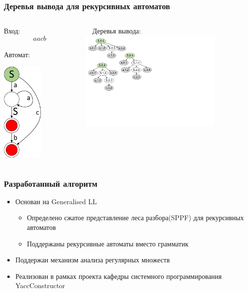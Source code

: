 \documentclass{beamer}
\begin{document}
	\begin{frame} 
		\frametitle{Деревья вывода для рекурсивных автоматов}
		\begin{columns}
			\begin{column}{3.7cm}
				Вход: $$aacb$$ \\
				\vspace{10pt}
				Автомат: \\
				\vspace{5pt}
				\begin{center}
					\includegraphics[width=2cm]{pictures/G0minimizedAutomaton.pdf}
				\end{center}
			\end{column}
		
     		\begin{column}{6cm}
     			\ \ Деревья вывода:\\
     			\vspace{5pt}
     			\includegraphics[width=7cm]{pictures/G0trees.pdf}
			\end{column}
		
		\end{columns}
	\end{frame}
	
	\begin{frame} 
		\frametitle{Разработанный алгоритм}
		\begin{itemize}
            \item Основан на Generalised LL
            \begin{itemize}
                \item Определено сжатое представление леса разбора(SPPF) для 
                рекурсивных автоматов
                \item Поддержаны рекурсивные автоматы вместо грамматик
            \end{itemize}
            \item Поддержан механизм анализа регулярных множеств
            \item Реализован в рамках проекта кафедры системного программирования YaccConstructor
		\end{itemize}
	\end{frame}
	
\end{document}
